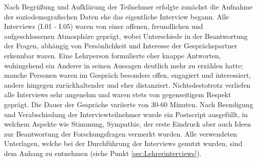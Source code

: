 Nach Begrüßung und Aufklärung der Teilnehmer erfolgte zunächst die Aufnahme der soziodemografischen Daten ehe das eigentliche Interview begann. Alle Interviews (I.01 - I.05) waren von einer offenen, freundlichen und aufgeschlossenen Atmosphäre geprägt, wobei Unterschiede in der Beantwortung der Fragen, abhängig von Persönlichkeit und Interesse der Gesprächspartner erkennbar waren. Eine Lehrperson formulierte eher knappe Antworten, wohingehend ein Anderer in seinen Aussagen deutlich mehr zu erzählen hatte; manche Personen waren im Gespräch besonders offen, engagiert und interessiert, andere hingegen zurückhaltender und eher distanziert. Nichtsdestotrotz verliefen alle Interviews sehr angenehm und waren stets von gegenseitigem Respekt geprägt. Die Dauer der Gespräche variierte von 30-60 Minuten. Nach Beendigung und Verabschiedung der Interviewteilnehmer wurde ein Postscript ausgefüllt, in welchem Aspekte wie Stimmung, Sympathie, der erste Eindruck aber auch Ideen zur Beantwortung der Forschungsfragen vermerkt wurden. Alle verwendeten Unterlagen, welche bei der Durchführung der Interviews genutzt wurden, sind dem Anhang zu entnehmen (siehe Punkt \ref{sec:Lehrerinterviews}).